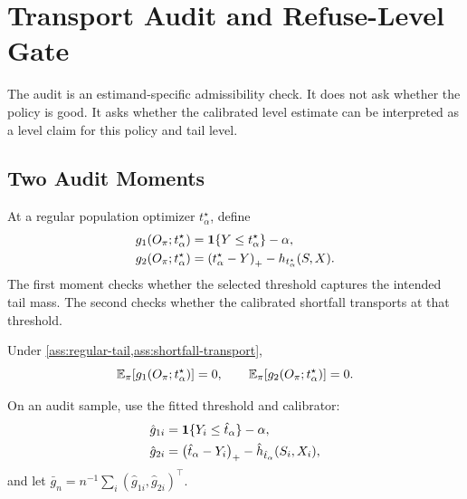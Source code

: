 \section{Transport Audit and Refuse-Level Gate}
\label{app:audit}

The audit is an estimand-specific admissibility check. It does not ask whether
the policy is good. It asks whether the calibrated level estimate can be
interpreted as a level claim for this policy and tail level.

\subsection{Two Audit Moments}
\label{app:audit-formal}

At a regular population optimizer $t_\alpha^\star$, define
\begin{align}
g_1(O_\pi;t_\alpha^\star)
&=\mathbf{1}\{Y\le t_\alpha^\star\}-\alpha,\\
g_2(O_\pi;t_\alpha^\star)
&=\left(t_\alpha^\star-Y\right)_{+}
-h_{t_\alpha^\star}(S,X).
\end{align}
The first moment checks whether the selected threshold captures the intended
tail mass. The second checks whether the calibrated shortfall transports at
that threshold.

\begin{theorem}
\label{thm:formal-two-moment}
Under \cref{ass:regular-tail,ass:shortfall-transport},
\[
\mathbb{E}_\pi[g_1(O_\pi;t_\alpha^\star)]=0,
\qquad
\mathbb{E}_\pi[g_2(O_\pi;t_\alpha^\star)]=0.
\]
\end{theorem}

\begin{twocolproof}
\end{twocolproof}

On an audit sample, use the fitted threshold and calibrator:
\begin{align}
\hat g_{1i}
&=\mathbf{1}\{Y_i\le\hat t_\alpha\}-\alpha,\\
\hat g_{2i}
&=\left(\hat t_\alpha-Y_i\right)_{+}
-\hat h_{\hat t_\alpha}(S_i,X_i),
\end{align}
and let $\bar g_n=n^{-1}\sum_i(\hat g_{1i},\hat g_{2i})^\top$.

